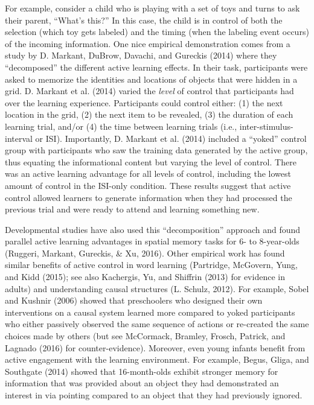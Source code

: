 \documentclass[english,floatsintext,man]{apa6}
\theoremstyle{definition}
\theoremstyle{definition}
\theoremstyle{definition}
\theoremstyle{remark}
\begin{document}
For example, consider a child who is playing with a set of toys and
turns to ask their parent, \enquote{What's this?} In this case, the
child is in control of both the selection (which toy gets labeled) and
the timing (when the labeling event occurs) of the incoming information.
One nice empirical demonstration comes from a study by D. Markant,
DuBrow, Davachi, and Gureckis (2014) where they \enquote{decomposed} the
different active learning effects. In their task, participants were
asked to memorize the identities and locations of objects that were
hidden in a grid. D. Markant et al. (2014) varied the \emph{level} of
control that participants had over the learning experience. Participants
could control either: (1) the next location in the grid, (2) the next
item to be revealed, (3) the duration of each learning trial, and/or (4)
the time between learning trials (i.e., inter-stimulus-interval or ISI).
Importantly, D. Markant et al. (2014) included a \enquote{yoked} control
group with participants who saw the training data generated by the
active group, thus equating the informational content but varying the
level of control. There was an active learning advantage for all levels
of control, including the lowest amount of control in the ISI-only
condition. These results suggest that active control allowed learners to
generate information when they had processed the previous trial and were
ready to attend and learning something new.

Developmental studies have also used this \enquote{decomposition}
approach and found parallel active learning advantages in spatial memory
tasks for 6- to 8-year-olds (Ruggeri, Markant, Gureckis, \& Xu, 2016).
Other empirical work has found similar benefits of active control in
word learning (Partridge, McGovern, Yung, and Kidd (2015); see also
Kachergis, Yu, and Shiffrin (2013) for evidence in adults) and
understanding causal structures (L. Schulz, 2012). For example, Sobel
and Kushnir (2006) showed that preschoolers who designed their own
interventions on a causal system learned more compared to yoked
participants who either passively observed the same sequence of actions
or re-created the same choices made by others (but see McCormack,
Bramley, Frosch, Patrick, and Lagnado (2016) for counter-evidence).
Moreover, even young infants benefit from active engagement with the
learning environment. For example, Begus, Gliga, and Southgate (2014)
showed that 16-month-olds exhibit stronger memory for information that
was provided about an object they had demonstrated an interest in via
pointing compared to an object that they had previously ignored.
\end{document}
